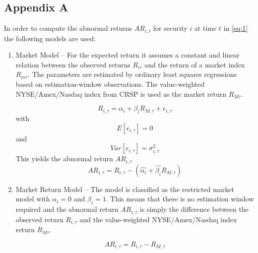 \documentclass[12pt]{article}
\begin{document}
\subsection{Appendix A}
In order to compute the abnormal returns $AR_{i,t}$ for security $i$ at time $t$ in \eqref{eq:1} the following models are used: 
\begin{enumerate}
	\item Market Model -- For the expected return it assumes a constant and linear relation between the observed returns $R_{i\tau}$ and the return of a market index $R_{m\tau}$. The parameters are estimated by ordinary least squares regressions based on estimation-window observations. The value-weighted NYSE/Amex/Nasdaq index from CRSP is used as the market return $R_{M\tau}$.

		\begin{equation}
			R_{i,\tau}=\alpha_{i}+\beta_{i}R_{M,\tau}+\epsilon_{i,\tau}
		\end{equation}
		with 
		\begin{equation}
			E[\epsilon_{i,\tau}]=0
		\end{equation}
		and 
		\begin{equation}
			Var[\epsilon_{i,\tau}]=\sigma^2_{i,\tau}
		\end{equation}
		This yields the abnormal return $AR_{i,\tau}$
		\begin{equation}
			AR_{i,\tau}=R_{i,\tau}-(\hat{\alpha_{i}}+\hat{\beta_{i}}R_{M,\tau})
		\end{equation}
		
	\item Market Return Model -- The model is classified as the restricted market model with $\alpha_{i}=0$ and $\beta_{i}=1$. This means that there is no estimation window required and the abnormal return $AR_{i,\tau}$ is simply the difference between the observed return $R_{i,\tau}$ and the value-weighted NYSE/Amex/Nasdaq index return $R_{M\tau}$.

		\begin{equation}\label{eq:6}
			AR_{i,\tau}=R_{i,\tau}-R_{M,\tau}
		\end{equation}

\end{enumerate}
\end{document}
